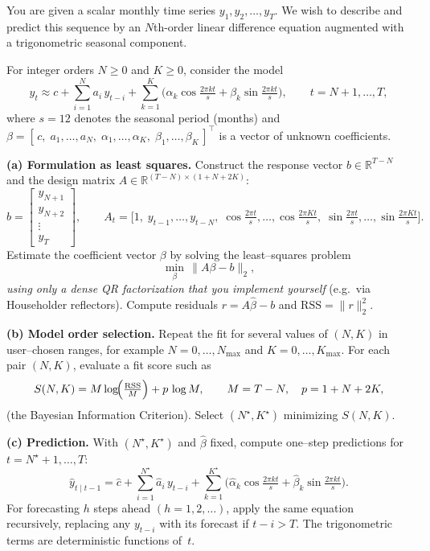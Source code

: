 \begin{problem}
You are given a scalar monthly time series $y_1, y_2, \dots, y_T$.
We wish to describe and predict this sequence by an $N$th-order
linear difference equation augmented with a trigonometric seasonal component.

\medskip
For integer orders $N \ge 0$ and $K \ge 0$, consider the model
\[
y_t \approx
c
+ \sum_{i=1}^{N} a_i\,y_{t-i}
+ \sum_{k=1}^{K} \!\Big(
  \alpha_k \cos\!\tfrac{2\pi k t}{s}
  + \beta_k \sin\!\tfrac{2\pi k t}{s}
\Big),
\qquad t = N+1, \dots, T,
\]
where $s=12$ denotes the seasonal period (months) and
$\beta = [\,c,\;a_1,\dots,a_N,\;\alpha_1,\dots,\alpha_K,\;\beta_1,\dots,\beta_K\,]^\top$
is a vector of unknown coefficients.

\medskip
\textbf{(a) Formulation as least squares.}
Construct the response vector $b\in\mathbb{R}^{T-N}$ and the design matrix
$A\in\mathbb{R}^{(T-N)\times(1+N+2K)}$:
\[
b =
\begin{bmatrix}
y_{N+1}\\
y_{N+2}\\
\vdots\\
y_T
\end{bmatrix},
\qquad
A_t =
\big[
1,\;
y_{t-1},\dots,y_{t-N},\;
\cos\tfrac{2\pi t}{s},\dots,\cos\tfrac{2\pi K t}{s},\;
\sin\tfrac{2\pi t}{s},\dots,\sin\tfrac{2\pi K t}{s}
\big].
\]
Estimate the coefficient vector $\beta$ by solving the least--squares problem
\[
\min_{\beta}\,\|A\beta - b\|_2,
\]
\emph{using only a dense QR factorization that you implement yourself}
(e.g.\ via Householder reflectors).
Compute residuals $r=A\hat\beta - b$ and
$\mathrm{RSS} = \|r\|_2^2$.

\medskip
\textbf{(b) Model order selection.}
Repeat the fit for several values of $(N,K)$ in user--chosen ranges,
for example $N=0,\dots,N_{\max}$ and $K=0,\dots,K_{\max}$.
For each pair $(N,K)$, evaluate a fit score such as
\[
S(N,K) =
M\log\!\Bigl(\tfrac{\mathrm{RSS}}{M}\Bigr)
+ p\,\log M,
\qquad
M=T-N,\quad
p = 1 + N + 2K,
\]
(the Bayesian Information Criterion).
Select $(N^\star,K^\star)$ minimizing $S(N,K)$.

\medskip
\textbf{(c) Prediction.}
With $(N^\star,K^\star)$ and $\hat\beta$ fixed,
compute one--step predictions for
$t=N^\star+1,\dots,T$:
\[
\widehat y_{t\mid t-1}
= \hat c
  + \sum_{i=1}^{N^\star}\hat a_i\,y_{t-i}
  + \sum_{k=1}^{K^\star}
      \big(
        \hat\alpha_k \cos\tfrac{2\pi k t}{s}
        + \hat\beta_k \sin\tfrac{2\pi k t}{s}
      \big).
\]
For forecasting $h$ steps ahead $(h=1,2,\dots)$, apply the same equation recursively,
replacing any $y_{t-i}$ with its forecast if $t-i>T$.
The trigonometric terms are deterministic functions of~$t$.


\end{problem}
